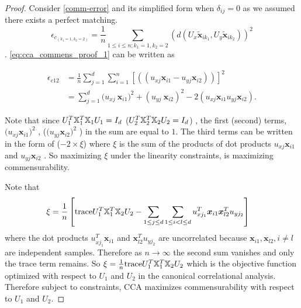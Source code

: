 \documentclass[12pt,oneside,final]{thesis}
\begin{document}
\begin{proof}
 Consider \ref{comm-error} and its simplified form when $\delta_{ij}=0$ as we assumed there exists a perfect matching. 
 \[\epsilon_{c_{(k_1=1,k_2=2)}} = \frac{1}{n} \sum_{1 \leq i \leq n;k_1=1,k_2=2} (d(U_x\widetilde{\bm{x}}_{ik_1},U_y \widetilde{\bm{x}}_{ik_2}))^2
\label{eq:cca_commens_proof_1}\]
. \ref{eq:cca_commens_proof_1} can be written as

\begin{align*}
\epsilon_{c12} &=  \frac{1}{n}  \sum_{j=1}^d \sum_{i=1}^n \left[((u_{xj}{\bm{x}}_{i1}-u_{yj} {\bm{x}}_{i2}))\right]^2 \\
&=  \sum_{j=1}^d {(u_{xj}\ {\bm{x}}_{i1}})^2+ ( u_{yj} \ {\bm{x}}_{i2})^2 - 2 (u_{xj}  {\bm{x}}_{i1} u_{yj}  {\bm{x}}_{i2}).
\end{align*}


Note that since $U_1^{T}\mathbb{X}_1^{T}\mathbb{X}_1U_1=I_d$ ($U_2^{T}\mathbb{X}_2^{T}\mathbb{X}_2U_2=I_d$) , the first (second) terms, ${(u_{xj} {\bm{x}}_{i1}})^2  $ , 
(${(u_{yj} {\bm{x}}_{i2}})^2 $ )
in the sum are equal to  $1$. The third terms can be written in the form of  ($ -2 \times \xi$) where $\xi$ is the sum of the products of dot products  $u_{xj}  {\bm{x}}_{i1}$ and  $u_{yj}  {\bm{x}}_{i2}$  . So maximizing $\xi$ under the linearity constraints,  is maximizing  commensurability.


Note that 
\begin{align*}
\xi &=  \frac{1}{n} \left[ \textup{trace}{U_1^{T}\mathbb{X}_1^{T}\mathbb{X}_2U_2} - \sum_{1 \leq j \leq d} \sum_{1 \leq i < l \leq d} u_{xj_1}^T  {\bm{x}}_{i1}  {\bm{x}}_{l2}^T u_{yj_2} \right]
\end{align*}
where the dot products $u_{xj_1}^T  {\bm{x}}_{i1}$ and  $ {\bm{x}}_{l2}^T u_{yj_2}$  are uncorrelated because ${\bm{x}}_{i1},{\bm{x}}_{l2}, i \neq l$  are independent samples. Therefore as $n \rightarrow \infty$ the second sum vanishes and only the trace term remains.  
So $\xi= \frac{1}{n}\textup{trace}{U_1^{T}\mathbb{X}_1^{T}\mathbb{X}_2U_2}$ which is the objective function optimized with respect to $U_1$ and $U_2$ in the canonical correlational analysis. Therefore subject to constraints, CCA maximizes commensurability  with respect to $U_1$ and $U_2$.

\end{proof}
\end{document}
